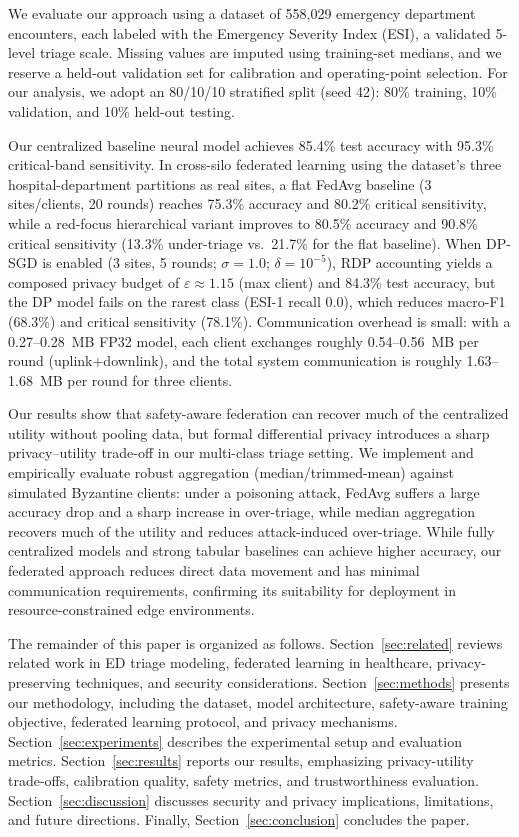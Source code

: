 \documentclass[journal,article,submit,pdftex,moreauthors]{Definitions/mdpi}
\begin{document}
We evaluate our approach using a dataset of 558,029 emergency department encounters, each labeled with the Emergency Severity Index (ESI), a validated 5-level triage scale. Missing values are imputed using training-set medians, and we reserve a held-out validation set for calibration and operating-point selection. For our analysis, we adopt an 80/10/10 stratified split (seed 42): 80\% training, 10\% validation, and 10\% held-out testing.

Our centralized baseline neural model achieves 85.4\% test accuracy with 95.3\% critical-band sensitivity. In cross-silo federated learning using the dataset's three hospital-department partitions as real sites, a flat FedAvg baseline (3 sites/clients, 20 rounds) reaches 75.3\% accuracy and 80.2\% critical sensitivity, while a red-focus hierarchical variant improves to 80.5\% accuracy and 90.8\% critical sensitivity (13.3\% under-triage vs.\ 21.7\% for the flat baseline). When DP-SGD is enabled (3 sites, 5 rounds; $\sigma=1.0$; $\delta=10^{-5}$), RDP accounting yields a composed privacy budget of $\varepsilon\approx1.15$ (max client) and 84.3\% test accuracy, but the DP model fails on the rarest class (ESI-1 recall 0.0), which reduces macro-F1 (68.3\%) and critical sensitivity (78.1\%). Communication overhead is small: with a 0.27--0.28~MB FP32 model, each client exchanges roughly 0.54--0.56~MB per round (uplink+downlink), and the total system communication is roughly 1.63--1.68~MB per round for three clients.

Our results show that safety-aware federation can recover much of the centralized utility without pooling data, but formal differential privacy introduces a sharp privacy--utility trade-off in our multi-class triage setting. We implement and empirically evaluate robust aggregation (median/trimmed-mean) against simulated Byzantine clients: under a poisoning attack, FedAvg suffers a large accuracy drop and a sharp increase in over-triage, while median aggregation recovers much of the utility and reduces attack-induced over-triage. While fully centralized models and strong tabular baselines can achieve higher accuracy, our federated approach reduces direct data movement and has minimal communication requirements, confirming its suitability for deployment in resource-constrained edge environments.

The remainder of this paper is organized as follows. Section~\ref{sec:related} reviews related work in ED triage modeling, federated learning in healthcare, privacy-preserving techniques, and security considerations. Section~\ref{sec:methods} presents our methodology, including the dataset, model architecture, safety-aware training objective, federated learning protocol, and privacy mechanisms. Section~\ref{sec:experiments} describes the experimental setup and evaluation metrics. Section~\ref{sec:results} reports our results, emphasizing privacy-utility trade-offs, calibration quality, safety metrics, and trustworthiness evaluation. Section~\ref{sec:discussion} discusses security and privacy implications, limitations, and future directions. Finally, Section~\ref{sec:conclusion} concludes the paper.
\end{document}
